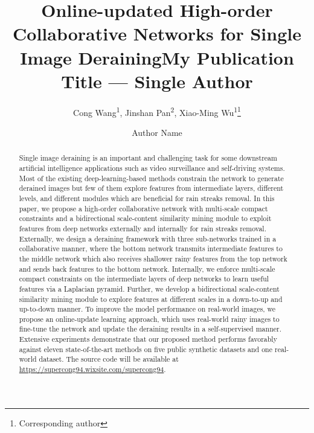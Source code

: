 \documentclass[letterpaper]{article} %
\title{Online-updated High-order Collaborative Networks for Single Image Deraining}
\author {
    Cong Wang\textsuperscript{\rm 1},
    Jinshan Pan\textsuperscript{\rm 2},
    Xiao-Ming Wu\textsuperscript{\rm 1}\thanks{\rm Corresponding author}
}
\title{My Publication Title --- Single Author}
\author {
    Author Name
}
\begin{document}
\maketitle
\begin{abstract}
Single image deraining is an important and challenging task for some downstream artificial intelligence applications such as video surveillance and self-driving systems.
Most of the existing deep-learning-based methods constrain the network to generate derained images but few of them explore features from intermediate layers, different levels, and different modules which are beneficial for rain streaks removal.
In this paper, we propose a high-order collaborative network with multi-scale compact constraints and a bidirectional scale-content similarity mining module to exploit features from deep networks externally and internally for rain streaks removal.
Externally, we design a deraining framework with three sub-networks trained in a collaborative manner, where the bottom network transmits intermediate features to the middle network which also receives shallower rainy features from the top network and sends back features to the bottom network.
Internally, we enforce multi-scale compact constraints on the intermediate layers of deep networks to learn useful features via a Laplacian pyramid.
Further, we develop a bidirectional scale-content similarity mining module to explore features at different scales in a down-to-up and up-to-down manner.
To improve the model performance on real-world images, we propose an online-update learning approach, which uses real-world rainy images to fine-tune the network and update the deraining results in a self-supervised manner.
Extensive experiments demonstrate that our proposed method performs favorably against eleven state-of-the-art methods on five public synthetic datasets and one real-world dataset.
The source code will be available at \url{https://supercong94.wixsite.com/supercong94}.
\end{abstract}
\end{document}
